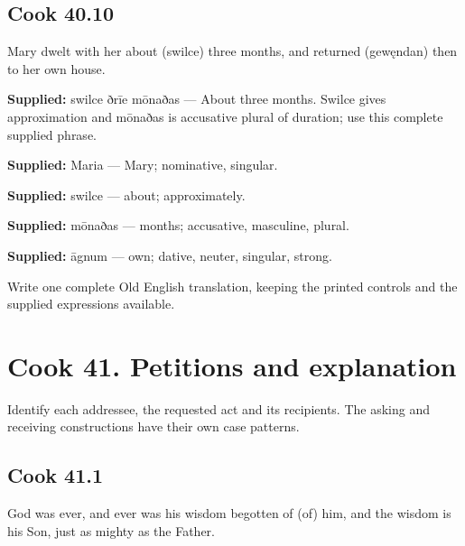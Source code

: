 \par\begin{minipage}{\linewidth}\raggedright
\subsection*{Cook 40.10}

Mary dwelt with her about (swilce) three months, and returned (gewęndan) then to her own house.

\end{minipage}\par\addvspace{4pt}

\textbf{Supplied:} swilce ðrīe mōnaðas — About three months. Swilce gives approximation and mōnaðas is accusative plural of duration; use this complete supplied phrase.

\textbf{Supplied:} Maria — Mary; nominative, singular.

\textbf{Supplied:} swilce — about; approximately.

\textbf{Supplied:} mōnaðas — months; accusative, masculine, plural.

\textbf{Supplied:} āgnum — own; dative, neuter, singular, strong.

Write one complete Old English translation, keeping the printed controls and the supplied expressions available.

\section*{Cook 41. Petitions and explanation}

Identify each addressee, the requested act and its recipients. The asking and receiving constructions have their own case patterns.

\par\begin{minipage}{\linewidth}\raggedright
\subsection*{Cook 41.1}

God was ever, and ever was his wisdom begotten of (of) him, and the wisdom is his Son, just as mighty as the Father.

\end{minipage}\par\addvspace{4pt}

